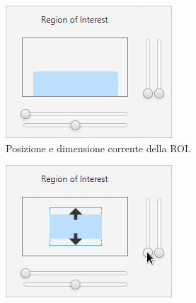 \documentclass[12pt]{article}
\begin{document}
\begin{figure}[htbp]
    \centering
    \begin{subfigure}[t]{0.32\textwidth}
        \includegraphics[width=\textwidth]{1.png}
        \caption{Posizione e dimensione corrente della ROI.}
    \end{subfigure}
    \begin{subfigure}[t]{0.32\textwidth}
        \includegraphics[width=\textwidth]{2.png}

\end{subfigure}
\end{figure}
\end{document}
